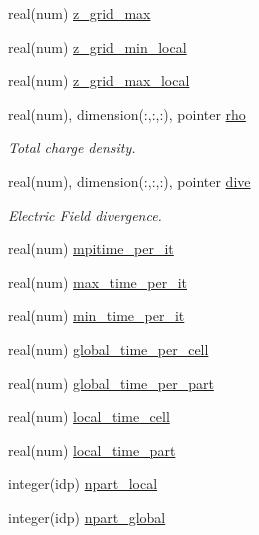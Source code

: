 \begin{DoxyCompactItemize}
real(num) \hyperlink{namespaceshared__data_a620f1c71c4db6b0f2b9f0acc6aefa10d}{z\+\_\+grid\+\_\+max}
\item 
real(num) \hyperlink{namespaceshared__data_a09f7e7f94540648ce5317cf34331f893}{z\+\_\+grid\+\_\+min\+\_\+local}
\item 
real(num) \hyperlink{namespaceshared__data_a456c52690b2fd4549464d70435bb3181}{z\+\_\+grid\+\_\+max\+\_\+local}
\item 
real(num), dimension(\+:,\+:,\+:), pointer \hyperlink{namespaceshared__data_a9cd7a07e41ca84210bf52e8480ac5d62}{rho}
\begin{DoxyCompactList}\small\item\em Total charge density. \end{DoxyCompactList}\item 
real(num), dimension(\+:,\+:,\+:), pointer \hyperlink{namespaceshared__data_a548e3c8fc335921c106eada05587df31}{dive}
\begin{DoxyCompactList}\small\item\em Electric Field divergence. \end{DoxyCompactList}\item 
real(num) \hyperlink{namespaceshared__data_a0a831038bb26f462cfcbb55ed577eca7}{mpitime\+\_\+per\+\_\+it}
\item 
real(num) \hyperlink{namespaceshared__data_ab3fad0c11b277d8e2932f2bb561174c0}{max\+\_\+time\+\_\+per\+\_\+it}
\item 
real(num) \hyperlink{namespaceshared__data_a432338eee67029c7662a11e912c8d46d}{min\+\_\+time\+\_\+per\+\_\+it}
\item 
real(num) \hyperlink{namespaceshared__data_ab51a77acb74b422253df3dd1b679f6dd}{global\+\_\+time\+\_\+per\+\_\+cell}
\item 
real(num) \hyperlink{namespaceshared__data_a689bcd908f5e464afc037e6f78dd6d49}{global\+\_\+time\+\_\+per\+\_\+part}
\item 
real(num) \hyperlink{namespaceshared__data_a66b7cc87acc2d0570007065692788888}{local\+\_\+time\+\_\+cell}
\item 
real(num) \hyperlink{namespaceshared__data_ab078d1e05e9fcee7f81e723b0074f5f9}{local\+\_\+time\+\_\+part}
\item 
integer(idp) \hyperlink{namespaceshared__data_a4d52b152090f02e4e16a9fe24e0e1ec3}{npart\+\_\+local}
\item 
integer(idp) \hyperlink{namespaceshared__data_a630ce8e0e1ba68428eacff437d15f6cc}{npart\+\_\+global}
\end{DoxyCompactItemize}


